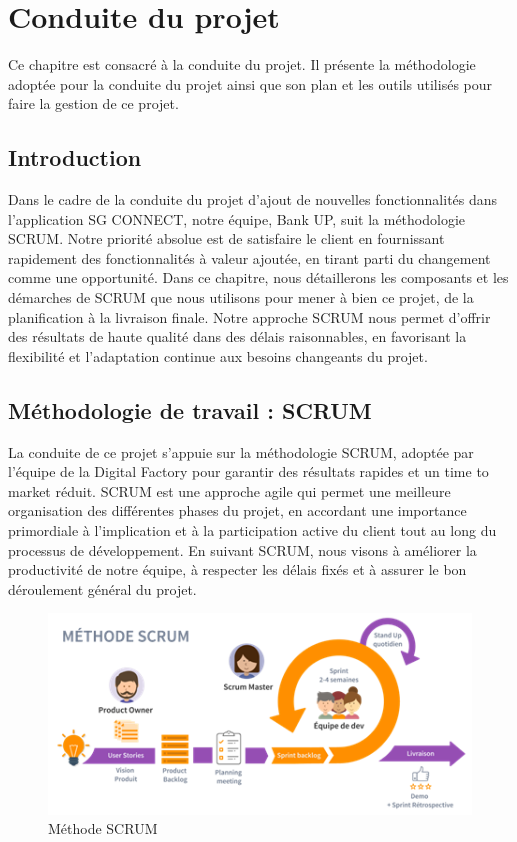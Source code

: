 \chapter{Conduite du projet}

Ce chapitre est consacré à la conduite du projet. Il présente la méthodologie adoptée pour la conduite du projet ainsi que son plan et les outils utilisés pour faire la gestion de ce projet.

\clearpage
\label{sec:organisme}

\section{Introduction}
Dans le cadre de la conduite du projet d'ajout de nouvelles fonctionnalités dans l'application SG CONNECT, notre équipe, Bank UP, suit la méthodologie SCRUM. Notre priorité absolue est de satisfaire le client en fournissant rapidement des fonctionnalités à valeur ajoutée, en tirant parti du changement comme une opportunité. Dans ce chapitre, nous détaillerons les composants et les démarches de SCRUM que nous utilisons pour mener à bien ce projet, de la planification à la livraison finale. Notre approche SCRUM nous permet d'offrir des résultats de haute qualité dans des délais raisonnables, en favorisant la flexibilité et l'adaptation continue aux besoins changeants du projet.

\section{Méthodologie de travail : SCRUM}
La conduite de ce projet s'appuie sur la méthodologie SCRUM, adoptée par l'équipe de la Digital Factory pour garantir des résultats rapides et un time to market réduit. SCRUM est une approche agile qui permet une meilleure organisation des différentes phases du projet, en accordant une importance primordiale à l'implication et à la participation active du client tout au long du processus de développement. En suivant SCRUM, nous visons à améliorer la productivité de notre équipe, à respecter les délais fixés et à assurer le bon déroulement général du projet.

\begin{figure}[!h]
    \centering %
        \includegraphics[width=14cm]{images/conduite/SCRUM.png}
    \caption{Méthode SCRUM}
\end{figure}

